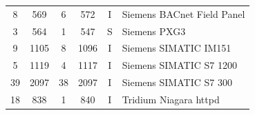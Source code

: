 \begin{table}[!htb]
\begin{tabular}{|c|c|c|c|c|l|}
			\hspace*{-0.15cm} 8	& \hspace*{-0.15cm} 569	& \hspace*{-0.15cm} 6	& \hspace*{-0.15cm} 572	& \hspace*{-0.15cm} I	& \hspace*{-0.15cm} Siemens BACnet Field Panel	 \\
			\hspace*{-0.15cm} 3	& \hspace*{-0.15cm} 564	& \hspace*{-0.15cm} 1	& \hspace*{-0.15cm} 547	& \hspace*{-0.15cm} S	& \hspace*{-0.15cm} Siemens PXG3	 \\
			\hspace*{-0.15cm} 9	& \hspace*{-0.15cm} 1105	& \hspace*{-0.15cm} 8	& \hspace*{-0.15cm} 1096	& \hspace*{-0.15cm} I	& \hspace*{-0.15cm} Siemens SIMATIC IM151	 \\
			\hspace*{-0.15cm} 5	& \hspace*{-0.15cm} 1119	& \hspace*{-0.15cm} 4	& \hspace*{-0.15cm} 1117	& \hspace*{-0.15cm} I	& \hspace*{-0.15cm} Siemens SIMATIC S7 1200	 \\
			\hspace*{-0.15cm} 39	& \hspace*{-0.15cm} 2097	& \hspace*{-0.15cm} 38	& \hspace*{-0.15cm} 2097	& \hspace*{-0.15cm} I	& \hspace*{-0.15cm} Siemens SIMATIC S7 300	 \\
			\hspace*{-0.15cm} 18	& \hspace*{-0.15cm} 838	& \hspace*{-0.15cm} 1	& \hspace*{-0.15cm} 840	& \hspace*{-0.15cm} I	& \hspace*{-0.15cm} Tridium Niagara httpd	 \\

\end{tabular}
\end{table}
